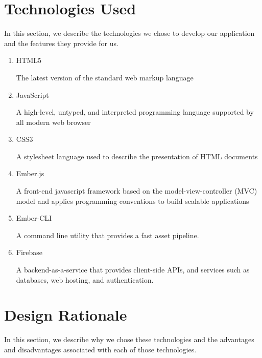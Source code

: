 \section{Technologies Used}
In this section, we describe the technologies we chose to develop our application and the features they provide for us.

\begin{enumerate}
\item HTML5 \par The latest version of the standard web markup language
\item JavaScript \par A high-level, untyped, and interpreted programming  language supported by all modern web browser
\item CSS3 \par A stylesheet language used to describe the presentation of HTML documents
\item Ember.js \par A front-end javascript framework based on the model-view-controller (MVC) model and applies programming conventions to build scalable applications
\item Ember-CLI \par A command line utility that provides a fast asset pipeline.
\item  Firebase \par A backend-as-a-service that provides client-side APIs, and services such as databases, web hosting, and authentication.
\end{enumerate}

\section{Design Rationale}
In this section, we describe why we chose these technologies and the advantages and disadvantages associated with each of those technologies. 
